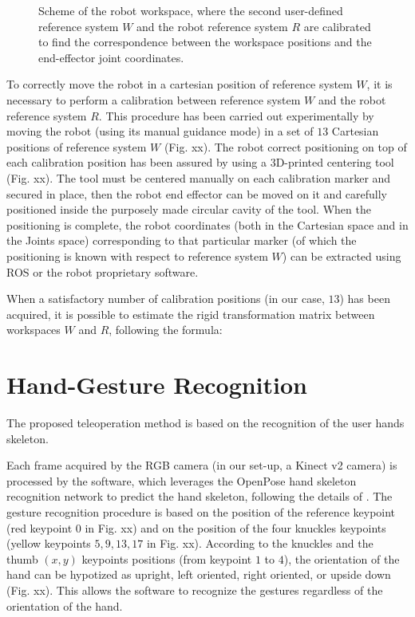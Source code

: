 \documentclass[letterpaper, 10 pt, conference]{ieeeconf}  %
\begin{document}
\begin{figure} [h!]
  \centering
  \caption{Scheme of the robot workspace, where the second user-defined reference system $W$ and the robot reference system $R$ are calibrated to find the correspondence between the workspace positions and the end-effector joint coordinates.}
  \label{fig:w2}
\end{figure}

To correctly move the robot in a cartesian position of reference system $W$, it is necessary to perform a calibration between reference system $W$ and the robot reference system $R$. This procedure has been carried out experimentally by moving the robot (using its manual guidance mode) in a set of $13$ Cartesian positions of reference system $W$ (Fig. xx). %
The robot correct positioning on top of each calibration position has been assured by using a 3D-printed centering tool (Fig. xx). The tool must be centered manually on each calibration marker and secured in place, then the robot end effector can be moved on it and carefully positioned inside the purposely made circular cavity of the tool. When the positioning is complete, the robot coordinates (both in the Cartesian space and in the Joints space) corresponding to that particular marker (of which the positioning is known with respect to reference system $W$) can be extracted using ROS or the robot proprietary software.

When a satisfactory number of calibration positions (in our case, $13$) has been acquired, it is possible to estimate the rigid transformation matrix between workspaces $W$ and $R$, following the formula: %

\section{Hand-Gesture Recognition}\label{sec:HG_recon}

The proposed teleoperation method is based on the recognition of the user hands skeleton.

Each frame acquired by the RGB camera (in our set-up, a Kinect v2 camera) is processed by the software, which leverages the OpenPose hand skeleton recognition network to predict the hand skeleton, following the details of \cite{simon2017hand}.
The gesture recognition procedure is based on the position of the reference keypoint (red keypoint $0$ in Fig. xx) and on the position of the four knuckles keypoints (yellow keypoints $5, 9, 13, 17$ in Fig. xx). According to the knuckles and the thumb $(x, y)$ keypoints positions (from keypoint $1$ to $4$), the orientation of the hand can be hypotized as upright, left oriented, right oriented, or upside down (Fig. xx). This allows the software to recognize the gestures regardless of the orientation of the hand. %
\end{document}
